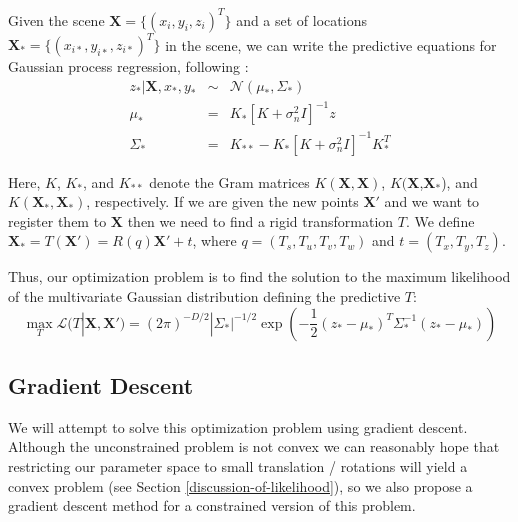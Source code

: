 \documentclass{article} %
\begin{document}
Given the scene $\mathbf{X} = \{(x_i,y_i,z_i)^T\}$ and a set of locations $\mathbf{X}_{*} = \{(x_{i*},y_{i*},z_{i*})^T\}$ in the scene, we can write the predictive equations for Gaussian process regression, following \cite{rasmussen2006gaussian}:
\begin{eqnarray}
z_{*} | \mathbf{X}, x_*,y_* &\sim& \mathcal{N}(\mu_*, \Sigma_*) \\
\mu_* &=& K_*[K + \sigma_n^2 I]^{-1} z \\
\Sigma_* &=& K_{**} - K_*[K + \sigma_n^2 I]^{-1} K_*^T
\end{eqnarray}


Here, $K$, $K_*$, and $K_{**}$ denote the Gram matrices $K(\mathbf{X},\mathbf{X})$, $K(\mathbf{X}$,$\mathbf{X_*}$), and $K(\mathbf{X_*},\mathbf{X_*})$, respectively. If we are given the new points $\mathbf{X'}$ and we want to register them to $\mathbf{X}$ then we need to find a rigid transformation $T$. We define $\mathbf{X_*} = T(\mathbf{X'}) = R(q)\mathbf{X'} + t$, where $q = (T_s, T_u,T_v,T_w)$ and $t = (T_x, T_y, T_z)$. 


Thus, our optimization problem is to find the solution to the maximum likelihood of the multivariate Gaussian distribution defining the predictive $T$:
\begin{equation}
\max_T \mathcal{L}(T|\mathbf{X}, \mathbf{X'}) = (2\pi)^{-D/2} |\Sigma_*|^{-1/2} \exp(-\frac{1}{2} (z_* - \mu_*)^T \Sigma_*^{-1} (z_* - \mu_*))
\end{equation}


\subsection{Gradient Descent}
We will attempt to solve this optimization problem using gradient descent. Although the unconstrained problem is not convex we can reasonably hope that restricting our parameter space to small translation / rotations will yield a convex problem (see Section \ref{discussion-of-likelihood}), so we also propose a gradient descent method for a constrained version of this problem. 
\end{document}
